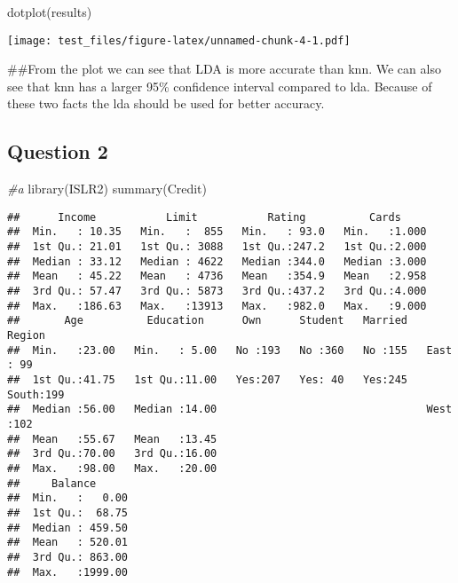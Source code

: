 \documentclass[
]{article}
\newenvironment{Shaded}{\begin{snugshade}}{\end{snugshade}}
\newcommand{\CommentTok}[1]{\textcolor[rgb]{0.56,0.35,0.01}{\textit{#1}}}
\newcommand{\FunctionTok}[1]{\textcolor[rgb]{0.00,0.00,0.00}{#1}}
\newcommand{\NormalTok}[1]{#1}
\begin{document}
\begin{Shaded}
\begin{Highlighting}[]
\FunctionTok{dotplot}\NormalTok{(results)}
\end{Highlighting}
\end{Shaded}

\texttt{[image: test\_files/figure-latex/unnamed-chunk-4-1.pdf]}

\#\#From the plot we can see that LDA is more accurate than knn. We can
also see that knn has a larger 95\% confidence interval compared to lda.
Because of these two facts the lda should be used for better accuracy.

\hypertarget{question-2}{%
\subsection{Question 2}\label{question-2}}

\begin{Shaded}
\begin{Highlighting}[]
\CommentTok{\#a}
\FunctionTok{library}\NormalTok{(ISLR2)}
\FunctionTok{summary}\NormalTok{(Credit)}
\end{Highlighting}
\end{Shaded}

\begin{verbatim}
##      Income           Limit           Rating          Cards      
##  Min.   : 10.35   Min.   :  855   Min.   : 93.0   Min.   :1.000  
##  1st Qu.: 21.01   1st Qu.: 3088   1st Qu.:247.2   1st Qu.:2.000  
##  Median : 33.12   Median : 4622   Median :344.0   Median :3.000  
##  Mean   : 45.22   Mean   : 4736   Mean   :354.9   Mean   :2.958  
##  3rd Qu.: 57.47   3rd Qu.: 5873   3rd Qu.:437.2   3rd Qu.:4.000  
##  Max.   :186.63   Max.   :13913   Max.   :982.0   Max.   :9.000  
##       Age          Education      Own      Student   Married     Region   
##  Min.   :23.00   Min.   : 5.00   No :193   No :360   No :155   East : 99  
##  1st Qu.:41.75   1st Qu.:11.00   Yes:207   Yes: 40   Yes:245   South:199  
##  Median :56.00   Median :14.00                                 West :102  
##  Mean   :55.67   Mean   :13.45                                            
##  3rd Qu.:70.00   3rd Qu.:16.00                                            
##  Max.   :98.00   Max.   :20.00                                            
##     Balance       
##  Min.   :   0.00  
##  1st Qu.:  68.75  
##  Median : 459.50  
##  Mean   : 520.01  
##  3rd Qu.: 863.00  
##  Max.   :1999.00
\end{verbatim}
\end{document}
